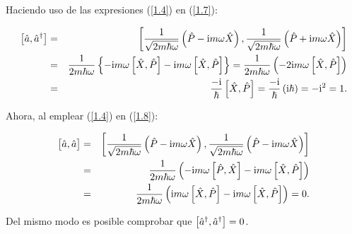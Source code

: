 \begin{solution}
\vspace{1mm}
Haciendo uso de las expresiones (\ref{1.4}) en (\ref{1.7}):


\begin{eqnarray*}
\left[ \hat{a}, \hat{a}^{\dagger }\right] &=&\left[ \frac{1}{\sqrt{2m\hbar \omega }} \left( \hat{P} - \mathrm{i} m \omega \hat{X} \right) ,\frac{1}{\sqrt{2m\hbar \omega }}\left( \hat{P}+\mathrm{i} m\omega \hat{X} \right) \right] \\
&=&\frac{1}{2m \hbar \omega }\left\{ -\mathrm{i} m \omega \left[ \hat{X},\hat{P} \right] -\mathrm{i} m\omega \left[ \hat{X},\hat{P}\right] \right\} =\frac{1}{2m\hbar \omega }\left(-2\mathrm{i} m\omega \left[ \hat{X},\hat{P} \right] \right) \\
&=&\frac{-\mathrm{i}}{\hbar }\left[ \hat{X},\hat{P}\right] =\frac{-\mathrm{i}}{\hbar }\left( \mathrm{i}\hbar\right) =-\mathrm{i}^{2}=1.
\end{eqnarray*}


\noindent
Ahora, al emplear (\ref{1.4}) en (\ref{1.8}):

\begin{eqnarray*}
\comm\big{\Oaa}{\Oaa} &=&\left[ \frac{1}{\sqrt{2m\hbar \omega }}\left( \OP-\ii m\omega \OX \right) ,\frac{1}{\sqrt{2m\hbar \omega }}\left( \OP-\ii m\omega \OX\right) \right] \\
&=&\frac{1}{2m\hbar \omega }\left( -\ii m\omega \left[ \OP,\OX \right] -\ii m \omega \left[ \OX,\OP \right] \right) \\
&=&\frac{1}{2m\hbar \omega }\left( \ii m\omega \left[ \OX,\OP \right] -\ii m\omega \left[ \OX,\OP \right] \right) =0.
\end{eqnarray*}


\noindent
Del mismo modo es posible comprobar que $\left[ \hat{a}^{\dagger },\hat{a}^{\dagger}\right] =0$.
\end{solution}


